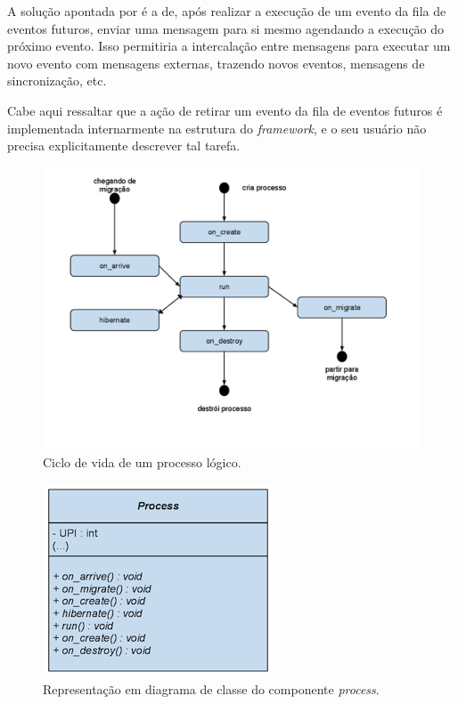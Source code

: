 A solução apontada por \cite{RIBEIROALVES} é a de, após realizar a execução de um evento da fila de eventos futuros, enviar uma mensagem para si mesmo agendando a execução do próximo evento. Isso permitiria a intercalação entre mensagens para executar um novo evento com mensagens externas, trazendo novos eventos, mensagens de sincronização, etc.

Cabe aqui ressaltar que a ação de retirar um evento da fila de eventos futuros é implementada internarmente na estrutura do \textit{framework}, e o seu usuário não precisa explicitamente descrever tal tarefa.

\begin{figure}
  \centerline{\includegraphics{estados_processos.png}}
  \caption{Ciclo de vida de um processo lógico.}
\label{fig:estados_processos}
\end{figure}

\begin{figure}
  \centerline{\includegraphics{process_uml.png}}
  \caption{Representação em diagrama de classe do componente \textit{process}.}
\label{fig:process_uml}
\end{figure}

